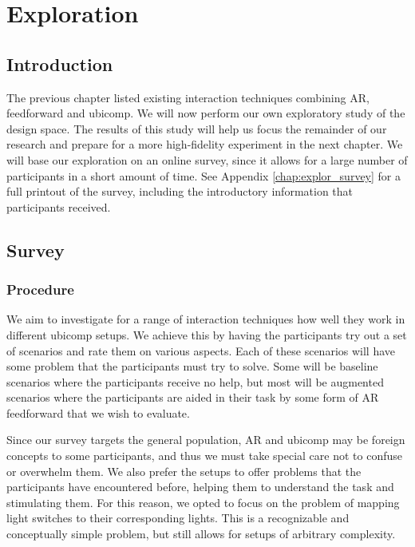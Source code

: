 \chapter{Exploration} \label{chap:explor}

\section{Introduction} \label{sec:explor:intro}
The previous chapter listed existing interaction techniques combining AR, feedforward and ubicomp. We will now perform our own exploratory study of the design space. The results of this study will help us focus the remainder of our research and prepare for a more high-fidelity experiment in the next chapter. We will base our exploration on an online survey, since it allows for a large number of participants in a short amount of time. See Appendix \ref{chap:explor_survey} for a full printout of the survey, including the introductory information that participants received.

\section{Survey} \label{sec:explor:survey}
    \subsection{Procedure} \label{subsec:explor:survey:procedure}
    We aim to investigate for a range of interaction techniques how well they work in different ubicomp setups. We achieve this by having the participants try out a set of scenarios and rate them on various aspects. Each of these scenarios will have some problem that the participants must try to solve. Some will be baseline scenarios where the participants receive no help, but most will be augmented scenarios where the participants are aided in their task by some form of AR feedforward that we wish to evaluate.

    Since our survey targets the general population, AR and ubicomp may be foreign concepts to some participants, and thus we must take special care not to confuse or overwhelm them. We also prefer the setups to offer problems that the participants have encountered before, helping them to understand the task and stimulating them. For this reason, we opted to focus on the problem of mapping light switches to their corresponding lights. This is a recognizable and conceptually simple problem, but still allows for setups of arbitrary complexity.
    
